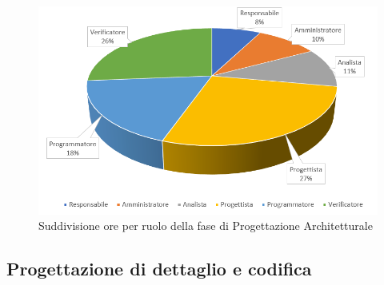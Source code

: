 \begin{figure}[h]
	\centering
	\caption{Suddivisione ore per ruolo della fase di Progettazione Architetturale}
	\includegraphics[scale=2]{sezioni/Aerogrammi/AerogrammaProgettArchitetturale.png}
\end{figure}

\clearpage
\subsection{Progettazione di dettaglio e codifica}


